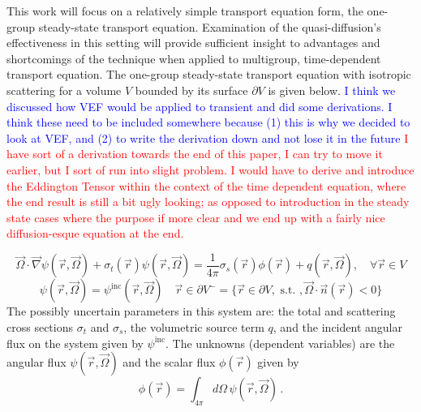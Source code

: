 \documentclass[12pt]{report}
\newcommand{\vr}{\vec{r}}
\newcommand{\vO}{\vec{\Omega}}
\newcommand{\grad}{\vec{\nabla}}
\newcommand{\sigt}{\sigma_t}
\newcommand{\sigs}{\sigma_s}
\newcommand{\comment}[2]{\marginpar{\textcolor{#2}{$\star$}}\textcolor{#2}{#1}\newline}
\newcommand{\iwh}[1]{\comment{#1}{red}}
\newcommand{\jcr}[1]{\comment{#1}{blue}}
\newcommand{\iwh}[1]{\phantom{a}}
\newcommand{\jcr}[1]{\phantom{a}}
\begin{document}
This work will focus on a relatively simple transport equation form, the one-group steady-state transport equation. Examination of the quasi-diffusion's effectiveness in this setting will provide sufficient insight to advantages and shortcomings of the technique when applied to multigroup, time-dependent transport equation. The one-group steady-state transport equation with isotropic scattering for a volume $V$ bounded by its surface $\partial V$ is given below.
\jcr{I think we discussed how VEF would be applied to transient and did some derivations. I think these need to be included somewhere because (1) this is why we decided to look at VEF, and (2) to write the derivation down and not lose it in the future}
\iwh{I have sort of a derivation towards the end of this paper, I can try to move it earlier, but I sort of run into slight problem.
I would have to derive and introduce the Eddington Tensor within the context of the time dependent equation, where the end result is still a bit ugly 
looking; as opposed to introduction in the steady state cases where the purpose if more clear and we end up with a fairly nice
diffusion-esque equation at the end.}

\begin{equation}
\label{SS1GTE}
\vO \cdot \grad \psi(\vr,\vO) + \sigt(\vr) \psi(\vr,\vO) = \frac{1}{4 \pi} \sigs(\vr) \phi(\vr) + q(\vr,\vO), \quad \forall \vr \in V
\end{equation}
\begin{equation}
\label{SS1GTE_bc}
\psi(\vr,\vO) = \psi^{\text{inc}}(\vr,\vO) \quad \vr \in \partial V^{-} = \{ \vr \in \partial V, \text{ s.t. }, \vO \cdot \vec{n}(\vr) < 0\}
\end{equation}
The possibly uncertain parameters in this system are: the total and scattering cross sections $\sigt$ and $\sigs$, the volumetric source term $q$, and the incident angular flux on the system given by $\psi^{\text{inc}}$. The unknowns (dependent variables) are the angular flux $\psi(\vr,\vO)$ and the scalar flux $\phi(\vr)$ given by
\[
\phi(\vr) = \int_{4\pi}d\Omega\,\psi(\vr,\vO) \,.
\]

\end{document}
